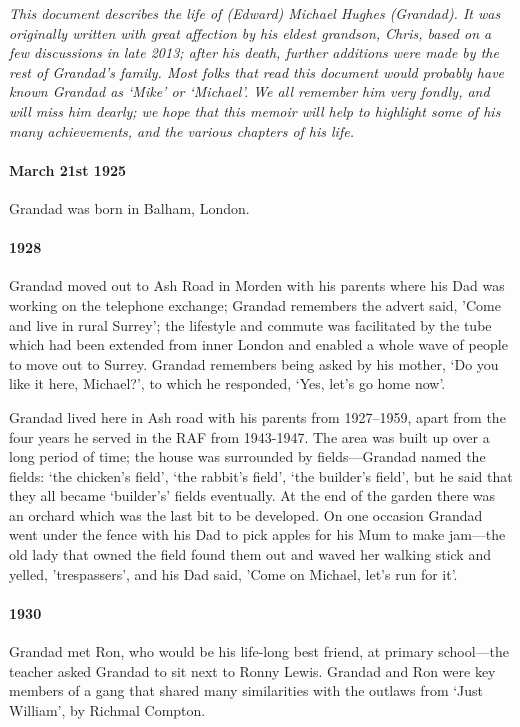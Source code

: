 %
{\itshape This document describes the life of (Edward) Michael Hughes (Grandad). It was
	originally written with great affection by his eldest grandson, Chris, based on a few discussions in late 2013; after
	his death, further additions were made by the rest of Grandad's family. Most folks that read this
	document would probably have known Grandad as `Mike' or `Michael'. We all remember him very fondly, and will
	miss him dearly; we hope that this memoir will help to highlight some of his many achievements, and the
various chapters of his life.}

\paragraph{March 21st 1925} Grandad was born in Balham, London.
\paragraph{1928} Grandad moved out to Ash Road in Morden with his parents where his Dad was working on the telephone exchange;
Grandad remembers the advert said, 'Come and live in rural Surrey'; the lifestyle and commute was facilitated
by the tube which had been extended from inner London and enabled a whole
wave of people to move out to Surrey. Grandad remembers being asked by
his mother, `Do you like it here, Michael?', to which he responded, `Yes, let's go home now'.

Grandad lived here in Ash road with his parents from 1927--1959, apart from the four years he served
in the RAF from 1943-1947.  The area was built up over a long period of time;
the house was surrounded by fields---Grandad named the fields: `the chicken's field',
`the rabbit's field', `the builder's field', but he said that they all became `builder's'
fields eventually. At the end of the garden there
was an orchard which was the last bit to be developed. On one occasion Grandad went under the
fence with his Dad to pick apples for his Mum to make jam---the old lady that owned the field
found them out and waved her walking stick and yelled, 'trespassers', and his
Dad said, 'Come on Michael, let's run for it'.

\paragraph{1930} Grandad met Ron, who would be his life-long best friend, at primary
school---the teacher asked Grandad to sit next to Ronny Lewis. Grandad and Ron were key members
of a gang that shared many similarities with the outlaws from `Just William', by Richmal Compton.

